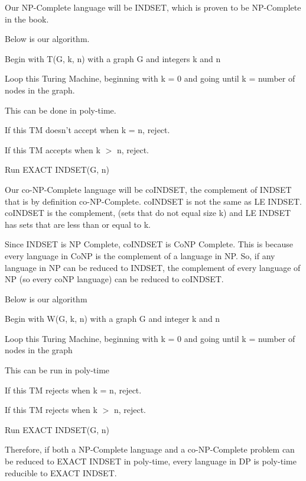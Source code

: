 \documentclass[12pt]{article}
\begin{document}
Our NP-Complete language will be INDSET, which is proven to be NP-Complete in the book.

Below is our algorithm.

Begin with T(G, k, n) with a graph G and integers k and n

Loop this Turing Machine, beginning with k = 0 and going until k = number of nodes in the graph.

This can be done in poly-time.

If this TM doesn't accept when k = n, reject.

If this TM accepts when k $>$ n, reject.

Run EXACT INDSET(G, n) 

Our co-NP-Complete language will be coINDSET, 
the complement of INDSET that is by definition 
co-NP-Complete. coINDSET is not the same 
as LE INDSET. coINDSET is the complement, (sets 
that do not equal size k) and LE INDSET has sets
that are less than or equal to k. 

Since INDSET is NP Complete, coINDSET is CoNP 
Complete. This is because every language in CoNP
is the complement of a language in NP. So, 
if any language in NP can be reduced to INDSET,
the complement of every language of NP (so every 
coNP language) can be reduced
to coINDSET. 

Below is our algorithm

Begin with W(G, k, n) with a graph G and integer k and n

Loop this Turing Machine, beginning with k = 0 and going until k = number of nodes in the graph

This can be run in poly-time

If this TM rejects when k = n, reject.

If this TM rejects when k $>$ n, reject.

Run EXACT INDSET(G, n)

Therefore, if both a NP-Complete language and a co-NP-Complete problem can be reduced to EXACT INDSET in
poly-time, every language in DP is poly-time reducible to EXACT INDSET.
\end{document}
